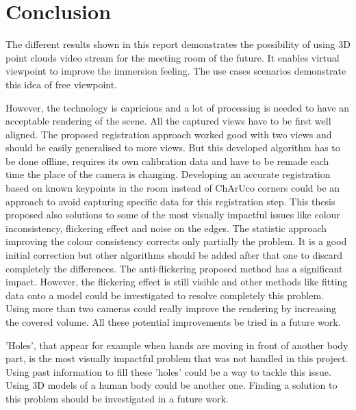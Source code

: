 \section{Conclusion}
\label{section:conclusion}

The different results shown in this report demonstrates the possibility of using 3D point clouds video stream for the meeting room of the future. It enables virtual viewpoint to improve the immersion feeling. The use cases scenarios demonstrate this idea of free viewpoint.

However, the technology is capricious and a lot of processing is needed to have an acceptable rendering of the scene. All the captured views have to be first well aligned. The proposed registration approach worked good with two views and should be easily generalised to more views. But this developed algorithm has to be done offline, requires its own calibration data and have to be remade each time the place of the camera is changing. Developing an accurate registration based on known keypoints in the room instead of ChArUco corners could be an approach to avoid capturing specific data for this registration step. This thesis proposed also solutions to some of the most visually impactful issues like colour inconsistency, flickering effect and noise on the edges. The statistic approach improving the colour consistency corrects only partially the problem. It is a good initial correction but other algorithms should be added after that one to discard completely the differences. The anti-flickering proposed method has a significant impact. However, the flickering effect is still visible and other methods like fitting data onto a model could be investigated to resolve completely this problem. Using more than two cameras could really improve the rendering by increasing the covered volume. All these potential improvements be tried in a future work.


'Holes', that appear for example when hands are moving in front of another body part, is the most visually impactful problem that was not handled in this project. Using past information to fill these 'holes' could be a way to tackle this issue. Using 3D models of a human body could be another one. Finding a solution to this problem should be investigated in a future work.

